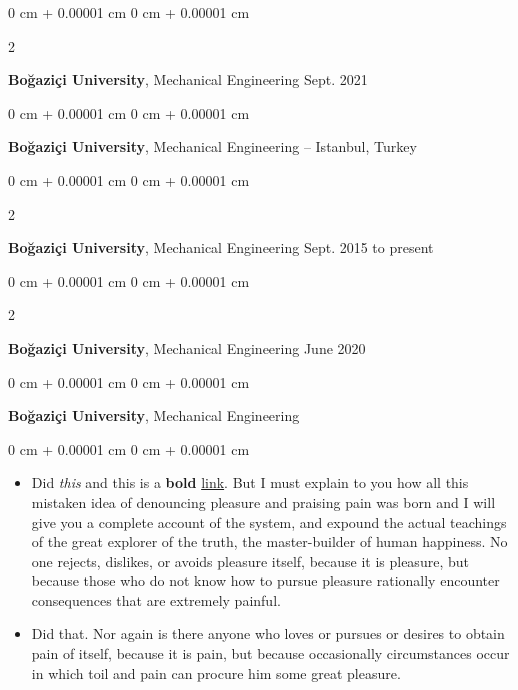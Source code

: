 \documentclass[10pt, letterpaper]{article}
\newenvironment{highlights}{
    \begin{itemize}[
        topsep=0.10 cm,
        parsep=0.10 cm,
        partopsep=0pt,
        itemsep=0pt,
        leftmargin=0 cm + 10pt
    ]
}{
    \end{itemize}
} %
\newenvironment{onecolentry}{
    \begin{adjustwidth}{
        0 cm + 0.00001 cm
    }{
        0 cm + 0.00001 cm
    }
}{
    \end{adjustwidth}
} %
\newenvironment{twocolentry}[2][]{
    \onecolentry
    \def\secondColumn{#2}
    \setcolumnwidth{\fill, 4.5 cm}
    \begin{paracol}{2}
}{
    \switchcolumn \raggedleft \secondColumn
    \end{paracol}
    \endonecolentry
} %
\begin{document}
        \vspace{0.2 cm}

        \begin{twocolentry}{
            Sept. 2021
        }
            \textbf{Boğaziçi University}, Mechanical Engineering\end{twocolentry}



        \vspace{0.2 cm}

        \begin{onecolentry}
            \textbf{Boğaziçi University}, Mechanical Engineering -- Istanbul, Turkey\end{onecolentry}



        \vspace{0.2 cm}

        \begin{twocolentry}{
            Sept. 2015 to present
        }
            \textbf{Boğaziçi University}, Mechanical Engineering\end{twocolentry}



        \vspace{0.2 cm}

        \begin{twocolentry}{
            June 2020
        }
            \textbf{Boğaziçi University}, Mechanical Engineering\end{twocolentry}



        \vspace{0.2 cm}

        \begin{onecolentry}
            \textbf{Boğaziçi University}, Mechanical Engineering\end{onecolentry}

        \vspace{0.10 cm}
        \begin{onecolentry}
            \begin{highlights}
                \item Did \textit{this} and this is a \textbf{bold} \href{https://example.com}{link}. But I must explain to you how all this mistaken idea of denouncing pleasure and praising pain was born and I will give you a complete account of the system, and expound the actual teachings of the great explorer of the truth, the master-builder of human happiness. No one rejects, dislikes, or avoids pleasure itself, because it is pleasure, but because those who do not know how to pursue pleasure rationally encounter consequences that are extremely painful.
                \item Did that. Nor again is there anyone who loves or pursues or desires to obtain pain of itself, because it is pain, but because occasionally circumstances occur in which toil and pain can procure him some great pleasure.
            \end{highlights}
        \end{onecolentry}
\end{document}
